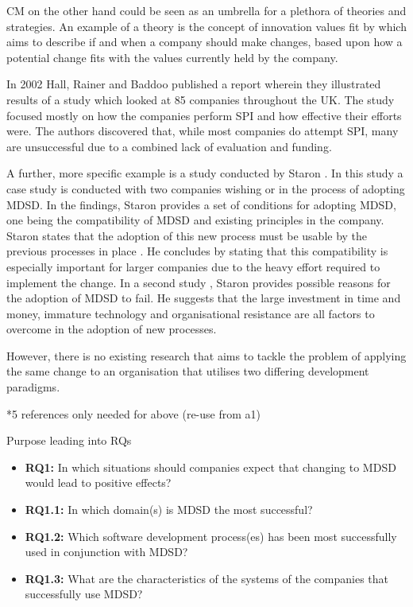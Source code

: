 \documentclass[10pt,twocolumn]{article}
\begin{document}
CM on the other hand could be seen as an umbrella for a plethora of theories and strategies. An example of a theory is the concept of innovation values fit by \cite{klein1996challenge} which aims to describe if and when a company should make changes, based upon how a potential change fits with the values currently held by the company.

In 2002 Hall, Rainer and Baddoo \cite{hall2002implementing} published a report wherein they illustrated results of a study which looked at 85 companies throughout the UK. The study focused mostly on how the companies perform SPI and how effective their efforts were. The authors discovered that, while most companies do attempt SPI, many are unsuccessful due to a combined lack of evaluation and funding.

A further, more specific example is a study conducted by Staron \cite{staron2006adopting}. In this study a case study is conducted with two companies wishing or in the process of adopting MDSD. In the findings, Staron provides a set of conditions for adopting MDSD, one being the compatibility of MDSD and existing principles in the company. Staron states that the adoption of this new process must be usable by the previous processes in place \cite{staron2006adopting}. He concludes by stating that this compatibility is especially important for larger companies due to the heavy effort required to implement the change. In a second study \cite{staron2008transitioning}, Staron provides possible reasons for the adoption of MDSD to fail. He suggests that the large investment in time and money, immature technology and organisational resistance are all factors to overcome in the adoption of new processes.

However, there is no existing research that aims to tackle the problem of applying the same change to an organisation that utilises two differing development paradigms. 


*5 references only needed for above (re-use from a1)

Purpose leading into RQs

\begin{itemize}
\item \textbf{RQ1:} In which situations should companies expect that changing to MDSD would lead to positive effects? 
\item \textbf{RQ1.1:} In which domain(s) is MDSD the most successful? 
\item \textbf{RQ1.2:} Which software development process(es) has been most successfully used in conjunction with MDSD?
\item \textbf{RQ1.3:} What are the characteristics of the systems of the companies that successfully use MDSD?
\end{itemize}
\end{document}
